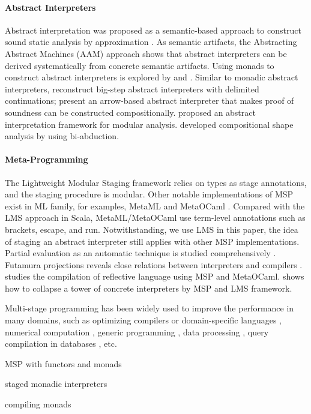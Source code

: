 \paragraph{Abstract Interpreters} Abstract interpretation was proposed as a
semantic-based approach to construct sound static analysis by approximation
\cite{DBLP:conf/popl/CousotC77}. As semantic artifacts, the Abstracting Abstract
Machines (AAM) \cite{DBLP:journals/jfp/HornM12, DBLP:conf/icfp/HornM10} approach
shows that abstract interpreters can be derived systematically from concrete
semantic artifacts.
Using monads to construct abstract interpreters is explored by
\citet{Sergey:2013:MAI:2491956.2491979} and
\citet{DBLP:journals/pacmpl/DaraisLNH17}.
Similar to monadic abstract interpreters, \citet{Wei:2018:RAA:3243631.3236800}
reconstruct big-step abstract interpreters with delimited continuations;
\citet{Keidel:2018:CSP:3243631.3236767} present an arrow-based abstract
interpreter that makes proof of soundness can be constructed compositionally.
\cite{DBLP:conf/cc/CousotC02} proposed an
abstract interpretation framework for modular analysis.
\citet{DBLP:conf/popl/CalcagnoDOY09} developed compositional shape analysis by
using bi-abduction.

\paragraph{Meta-Programming} The Lightweight Modular Staging framework relies on
types as stage annotations, and the staging procedure is modular. Other notable
implementations of MSP exist in ML family, for examples, MetaML
\cite{DBLP:conf/pepm/TahaS97} and MetaOCaml \cite{DBLP:conf/gpce/CalcagnoTHL03,
DBLP:conf/flops/Kiselyov14}. Compared with the LMS approach in Scala,
MetaML/MetaOCaml use term-level annotations such as brackets, escape, and run.
Notwithstanding, we use LMS in this paper, the idea of staging an abstract
interpreter still applies with other MSP implementations. Partial evaluation as
an automatic technique is studied comprehensively
\cite{10.1007/3-540-61580-6_11, DBLP:books/daglib/0072559}. Futamura projections
reveals close relations between interpreters and compilers \cite{Futamura1999,
futamura1971partial}. \citet{DBLP:conf/gpce/Asai14} studies the compilation of
reflective language using MSP and MetaOCaml.
\citeauthor{Amin:2017:CTI:3177123.3158140} shows how to collapse a tower of
concrete interpreters by MSP and LMS framework.

Multi-stage programming has been widely used to improve the performance in many
domains, such as optimizing compilers or domain-specific languages
\cite{DBLP:conf/pldi/RompfSBLCO14, DBLP:conf/snapl/RompfBLSJAOSKDK15,
DBLP:journals/tecs/SujeethBLRCOO14, DBLP:conf/gpce/SujeethGBLROO13,
DBLP:journals/jfp/CaretteKS09}, numerical computation \cite{PGL-038,
DBLP:conf/pepm/AktemurKKS13}, generic programming
\cite{DBLP:journals/pacmpl/Yallop17, Ofenbeck:2017:SGP:3136040.3136060}, data
processing \cite{DBLP:conf/oopsla/JonnalageddaCSRO14,
DBLP:conf/popl/KiselyovBPS17}, query compilation in databases
\cite{DBLP:conf/osdi/EssertelTDBOR18, DBLP:conf/sigmod/TahboubER18}, etc.

MSP with functors and monads \cite{10.1007/11561347_18}

staged monadic interpreters \cite{DBLP:conf/dsl/SheardBP99}

compiling monads \cite{danvy1991compiling}
